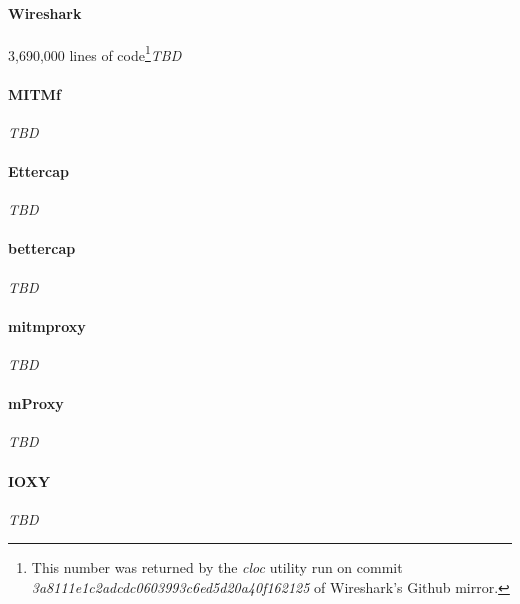 \paragraph{Wireshark} 3,690,000 lines of code\footnote{This number was returned by the \emph{cloc} utility run on commit \emph{3a8111e1c2adcdc0603993c6ed5d20a40f162125} of Wireshark's Github mirror.}\emph{TBD}
\paragraph{MITMf} \emph{TBD}
\paragraph{Ettercap} \emph{TBD}
\paragraph{bettercap} \emph{TBD}
\paragraph{mitmproxy} \emph{TBD}
\paragraph{mProxy} \emph{TBD}
\paragraph{IOXY} \emph{TBD}

